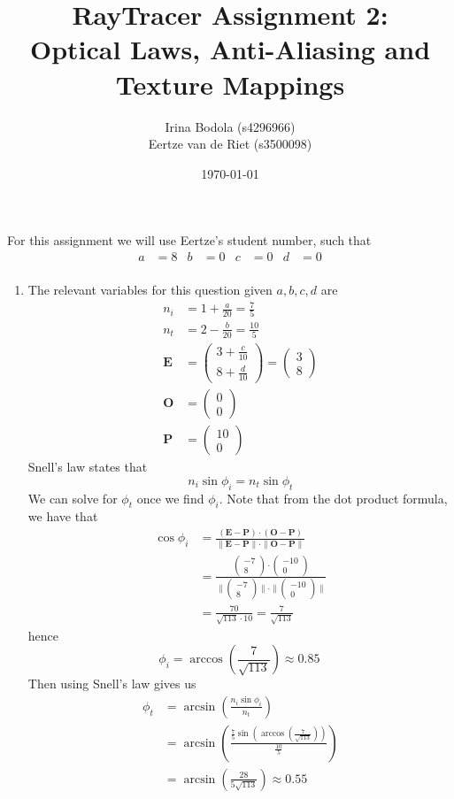 \documentclass{article}
\title{RayTracer Assignment 2:\\ Optical Laws, Anti-Aliasing and Texture Mappings}
\author{Irina Bodola (s4296966) \\ Eertze van de Riet (s3500098)}
\date{\today}
\renewcommand{\bf}[1]{\mathbf{#1}}
\newcommand{\pmat}[1]{\begin{pmatrix}#1\end{pmatrix}}
\begin{document}
        \maketitle
        For this assignment we will use Eertze's student number, such that    
        \begin{align*}
            a &= 8 & b &= 0 & c &= 0 & d &= 0 \\
        \end{align*}

        \begin{enumerate}
          \item The relevant variables for this question given $a,b,c,d$ are
          \begin{align*}
              n_i &= 1 + \frac{a}{20} = \frac{7}{5} \\
              n_t &= 2 - \frac{b}{20} = \frac{10}{5} \\
              \bf{E} &= \pmat{3 + \frac{c}{10} \\ 8 + \frac{d}{10}} = \pmat{3 \\ 8} \\
              \bf{O} &= \pmat{0 \\ 0} \\
              \bf{P} &= \pmat{10 \\ 0}
          \end{align*}
          Snell's law states that \begin{equation*}
            n_i\sin{\phi_i} = n_t\sin{\phi_t}
          \end{equation*}
          We can solve for $\phi_t$ once we find $\phi_i$.
          Note that from the dot product formula, we have that
          \begin{align*}
            \cos{\phi_i} &= \frac{(\bf{E}-\bf{P})\cdot(\bf{O}-\bf{P})}{\|\bf{E} - \bf{P}\|\cdot\|\bf{O} - \bf{P}\|} \\
            &= \frac{\pmat{-7 \\ 8}\cdot\pmat{-10 \\ 0}}{\|\pmat{-7 \\ 8}\|\cdot\|\pmat{-10 \\ 0}\|} \\
            &= \frac{70}{\sqrt{113}\cdot 10} = \frac{7}{\sqrt{113}}
          \end{align*}
          hence \begin{equation*}
            \phi_i = \arccos\left(\frac{7}{\sqrt{113}}\right) \approx 0.85\
          \end{equation*}
          Then using Snell's law gives us
          \begin{align*}
            \phi_t &= \arcsin\left(\frac{n_i\sin{\phi_i}}{n_t}\right) \\
            &= \arcsin\left(\frac{\frac{7}{5}\sin\left(\arccos\left(\frac{7}{\sqrt{113}}\right)\right)}{\frac{10}{5}}\right) \\
            &= \arcsin\left(\frac{28}{5\sqrt{113}}\right) \approx 0.55 \\
          \end{align*}
        \end{enumerate}

    
\end{document}
